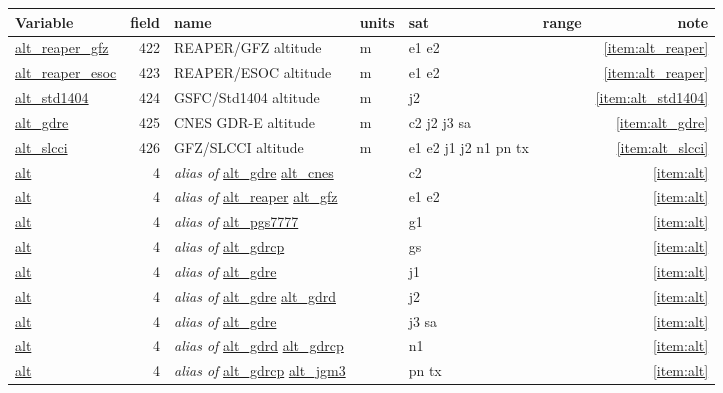 \documentclass[a4paper,11pt,openany,natbib,nomargin]{thesis}
\makeatletter
\newcommand\var[1]{\url{#1}\index{variables!#1@\protect\url{#1}}}
\newcommand\alias[1]{\emph{alias of} \var{#1}}
\newenvironment{vartable}{
\begin{table}[ht]
\small
\begin{tabular}{lrllllr}
\hline
Variable & field & name & units & sat & range & note \\
\hline
}{
\hline
\end{tabular}
\end{table}
}
\makeatother
\begin{document}
\begin{vartable}
\var{alt_reaper_gfz}  & 422 & REAPER/GFZ altitude & m & e1 e2 && \ref{item:alt_reaper} \\
\var{alt_reaper_esoc} & 423 & REAPER/ESOC altitude & m & e1 e2 && \ref{item:alt_reaper} \\
\var{alt_std1404}  & 424 & GSFC/Std1404 altitude & m & j2 && \ref{item:alt_std1404} \\
\var{alt_gdre}     & 425 & CNES GDR-E altitude & m & c2 j2 j3 sa && \ref{item:alt_gdre} \\
\var{alt_slcci}    & 426 & GFZ/SLCCI altitude & m & e1 e2 j1 j2 n1 pn tx && \ref{item:alt_slcci} \\
\hline
\var{alt} & 4 & \alias{alt_gdre} \var{alt_cnes} & & c2 && \ref{item:alt}\\
\var{alt} & 4 & \alias{alt_reaper} \var{alt_gfz} & & e1 e2 && \ref{item:alt} \\
\var{alt} & 4 & \alias{alt_pgs7777} & & g1 && \ref{item:alt} \\
\var{alt} & 4 & \alias{alt_gdrcp} & & gs && \ref{item:alt} \\
\var{alt} & 4 & \alias{alt_gdre} & & j1 && \ref{item:alt} \\
\var{alt} & 4 & \alias{alt_gdre} \var{alt_gdrd} & & j2 && \ref{item:alt} \\
\var{alt} & 4 & \alias{alt_gdre} & & j3 sa && \ref{item:alt} \\
\var{alt} & 4 & \alias{alt_gdrd} \var{alt_gdrcp} & & n1 && \ref{item:alt} \\
\var{alt} & 4 & \alias{alt_gdrcp} \var{alt_jgm3} & & pn tx && \ref{item:alt} \\
\end{vartable}
\end{document}
